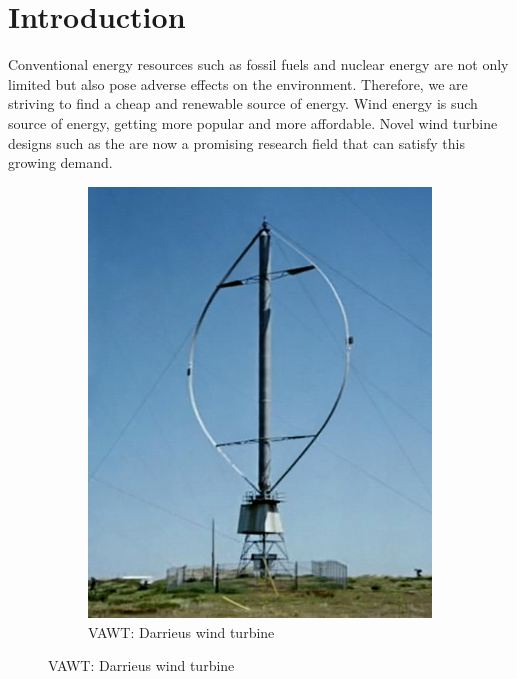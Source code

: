 \chapter{Introduction}
\label{ch:introduction}
Conventional energy resources such as fossil fuels and nuclear energy are not only limited but also pose adverse effects on the environment. Therefore, we are striving to find a cheap and renewable source of energy. Wind energy is such source of energy, getting more popular and more affordable. Novel wind turbine designs such as the  are now a promising research field that can satisfy this growing demand.

	\begin{figure}[!b]
        \centering
        \begin{subfigure}[b]{0.25\textwidth}
                \includegraphics[height=0.2\textheight]{figures/introduction/Darrieus-windmill.jpg}
                \caption{VAWT: Darrieus wind turbine\cite{darrieusWindmill}}
                \label{fig:Darrieus-windmill}
        \end{subfigure}%
        \qquad \qquad%

\end{figure}
